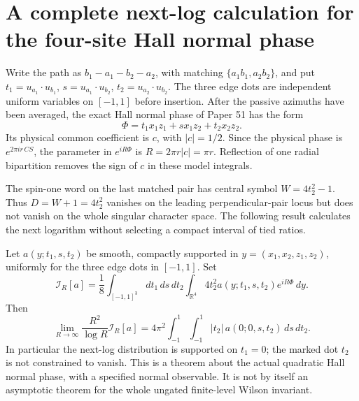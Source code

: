 \section{A complete next-log calculation for the four-site Hall normal phase}
\label{sec:p4-next-log-model}

Write the path as $b_1-a_1-b_2-a_2$, with matching
$\{a_1b_1,a_2b_2\}$, and put
$t_1=u_{a_1}\cdot u_{b_1}$, $s=u_{a_1}\cdot u_{b_2}$,
$t_2=u_{a_2}\cdot u_{b_2}$.
The three edge dots are independent uniform variables on $[-1,1]$
before insertion.  After the passive azimuths have been averaged,
the exact Hall normal phase of Paper 51 has the form
\[
 \Phi=t_1x_1z_1+s x_1z_2+t_2x_2z_2.
\]
Its physical common coefficient is $c$, with $|c|=1/2$.
Since the physical phase is $e^{2\pi i r\,CS}$,
the parameter in $e^{iR\Phi}$ is $R=2\pi r|c|=\pi r$.
Reflection of one radial bipartition removes
the sign of $c$ in these model integrals.

The spin-one word on the last matched pair has central symbol
$W=4t_2^2-1$.  Thus $D=W+1=4t_2^2$ vanishes on the leading
perpendicular-pair locus but does not vanish on the whole singular
character space.  The following result calculates the next logarithm
without selecting a compact interval of tied ratios.

\begin{proposition}
Let $a(y;t_1,s,t_2)$ be smooth, compactly supported in
$y=(x_1,x_2,z_1,z_2)$, uniformly for the three edge dots in $[-1,1]$.
Set
\[
 \mathcal I_R[a]=\frac18\int_{[-1,1]^3}\!dt_1\,ds\,dt_2
       \int_{\mathbb R^4}4t_2^2 a(y;t_1,s,t_2)e^{iR\Phi}\,dy.
\]
Then
\[
 \boxed{\quad
 \lim_{R\to\infty}\frac{R^2}{\log R}\mathcal I_R[a]
   =4\pi^2\int_{-1}^1\!\int_{-1}^1
          |t_2|\,a(0;0,s,t_2)\,ds\,dt_2 .\quad}
\]
In particular the next-log distribution is supported on $t_1=0$;
the marked dot $t_2$ is not constrained to vanish.  This is a theorem
about the actual quadratic Hall normal phase, with a specified normal
observable.  It is not by itself an asymptotic theorem for the whole
ungated finite-level Wilson invariant.
\end{proposition}

